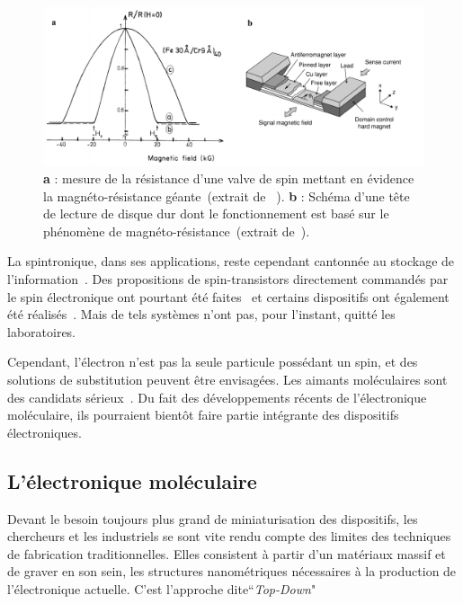 \begin{figure}
\centering \includegraphics[scale=0.45]{Spintronique/SpinValve/SpinValve.pdf}
\caption{\textbf{a} : mesure de la résistance d'une valve de spin mettant en évidence la magnéto-résistance géante~(extrait de ~\cite{Baibich1988}).  \textbf{b} : Schéma d'une tête de lecture de disque dur dont le fonctionnement est basé sur le phénomène de magnéto-résistance~(extrait de~\cite{Hitoshi2001}).}
\label{SpinValve}
\end{figure}



La spintronique, dans ses applications, reste cependant cantonnée au stockage de  l'information~\cite{Awschalom2007}. Des propositions de spin-transistors directement commandés par le spin électronique ont pourtant été faites~\cite{Datta1990} et certains dispositifs ont également été réalisés~\cite{Johnson1996,Huang2007}. Mais de tels systèmes n'ont pas, pour l'instant, quitté les laboratoires.

Cependant, l'électron n'est pas la seule particule possédant un spin, et des solutions de substitution peuvent être envisagées. Les aimants moléculaires sont des candidats sérieux~\cite{Bogani2008}. Du fait des développements récents de l'électronique moléculaire, ils pourraient bientôt faire partie intégrante des dispositifs électroniques. 

\subsection{L'électronique moléculaire}
Devant le besoin toujours plus grand de miniaturisation des dispositifs, les chercheurs et les industriels se sont vite rendu compte des limites des techniques de fabrication traditionnelles. Elles consistent à partir d'un matériaux massif et de graver en son sein, les structures nanométriques nécessaires à la production de l'électronique actuelle. C'est l'approche dite``\textit{Top-Down}"


